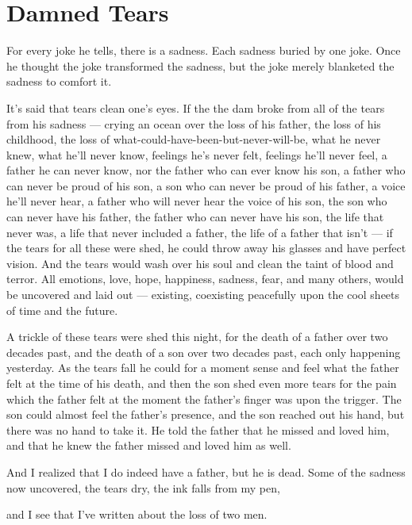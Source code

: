 \chapter{Damned Tears}

For every joke he tells, there is a sadness. Each sadness buried by one joke. Once he thought the joke transformed the sadness, but the joke merely blanketed the sadness to comfort it.

It’s said that tears clean one’s eyes. If the the dam broke from all of the tears from his sadness — crying an ocean over the loss of his father, the loss of his childhood, the loss of what-could-have-been-but-never-will-be, what he never knew, what he’ll never know, feelings he’s never felt, feelings he’ll never feel, a father he can never know, nor the father who can ever know his son, a father who can never be proud of his son, a son who can never be proud of his father, a voice he’ll never hear, a father who will never hear the voice of his son, the son who can never have his father, the father who can never have his son, the life that never was, a life that never included a father, the life of a father that isn’t — if the tears for all these were shed, he could throw away his glasses and have perfect vision. And the tears would wash over his soul and clean the taint of blood and terror. All emotions, love, hope, happiness, sadness, fear, and many others, would be uncovered and laid out — existing, coexisting peacefully upon the cool sheets of time and the future.

A trickle of these tears were shed this night, for the death of a father over two decades past, and the death of a son over two decades past, each only happening yesterday. As the tears fall he could for a moment sense and feel what the father felt at the time of his death, and then the son shed even more tears for the pain which the father felt at the moment the father’s finger was upon the trigger. The son could almost feel the father’s presence, and the son reached out his hand, but there was no hand to take it. He told the father that he missed and loved him, and that he knew the father missed and loved him as well.

And I realized that I do indeed have a father, but he is dead. Some of the sadness now uncovered, the tears dry, the ink falls from my pen,



and I see that I’ve written about the loss of two men.